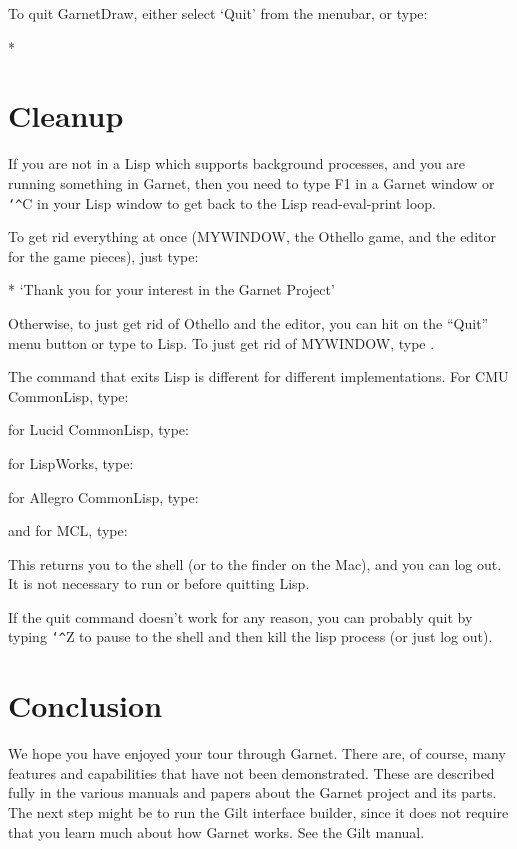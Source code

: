 To quit GarnetDraw, either select `Quit' from the menubar, or type:

\begin{programexample}
* 
\end{programexample}



\chapter{Cleanup}
\label{quitting}

If you are not in a Lisp which supports background processes, and
you are running something in Garnet, then you need to type F1 in a
Garnet window or {\tt\char`\^}C in your Lisp window to get back to the Lisp
read-eval-print loop.

To get rid everything at once (MYWINDOW, the Othello game, and the
editor for the game pieces), just type:
\begin{programexample}
* 
`Thank you for your interest in the Garnet Project'
\end{programexample}

Otherwise,
to just get rid of Othello and the editor, you can hit on the ``Quit'' menu
button or type  to Lisp.  To just get rid of MYWINDOW,
type .

The command that exits Lisp is different for different implementations.
For CMU CommonLisp, type: 

for Lucid CommonLisp, type: 

for LispWorks, type: 

for Allegro CommonLisp, type: 

and for MCL, type: 

This returns you to the shell (or to the finder on the Mac), and you
can log out.  It is not necessary to run  or
 before quitting Lisp.

If the quit command doesn't work for any reason,
you can probably quit by typing {\tt\char`\^}Z to pause to the shell and
then kill the lisp process (or just log out).

\chapter{Conclusion}
We hope you have enjoyed your tour through Garnet.  There are, of course,
many features and capabilities that have not been demonstrated.  These are
described fully in the various manuals and papers about the Garnet project
and its parts.  The next step might be to run the Gilt interface
builder, since it does not require that you learn much about how
Garnet works.  See the Gilt manual.

